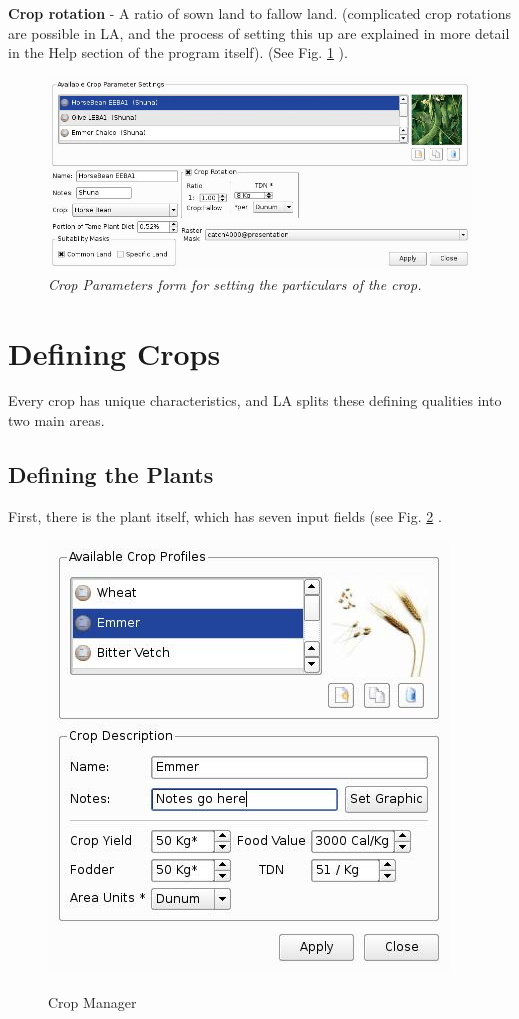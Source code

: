   \textbf{Crop rotation} - A ratio of sown land to fallow land. (complicated crop
  rotations are possible in LA, and the process of setting this up are
  explained in more detail in the Help section of the program itself). (See Fig. \ref{fig:cropParameters} ).
    \begin{figure}[htbp] %
        \includegraphics[scale=.28]{./images/cropParameters.jpg}
      \caption[Crop Parameters]{\label{fig:cropParameters}\textit{Crop
Parameters form for setting the particulars of the crop.}}
    \end{figure}

\section{Defining Crops}Every crop has unique
characteristics, and LA splits these defining qualities into two
main areas.
  \subsection{Defining the Plants}First, there is
  the plant itself, which has seven input fields (see Fig.
  \ref{fig:cropManager} .

      \begin{figure}[htbp]
        \includegraphics[scale=.6]{./images/cropManager.jpg}
      \label{fig:cropManager} \caption{Crop Manager}
    \end{figure}

